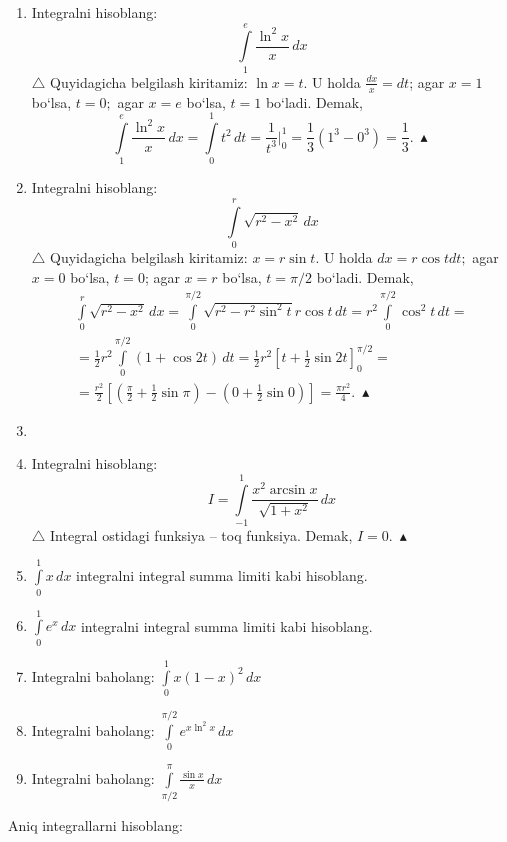 \begin{enumerate}
	\item Integralni hisoblang:
	$$\int\limits_{1}^{e}\frac{\ln^{2}x}{x}\,dx$$
	$\triangle$ Quyidagicha  belgilash kiritamiz: $\ln{x}=t$. U holda $\frac{dx}{x}=dt$; agar $x=1$ bo`lsa, $t=0;$ agar $x=e$ bo`lsa, $t=1$ bo`ladi. Demak,
	$$\int\limits_{1}^{e}\frac{\ln^{2}x}{x}\,dx=\int\limits_{0}^{1}t^{2}\,dt=\frac{1}{t^{3}}\bigg|_{0}^{1}=\frac{1}{3}(1^{3}-0^{3})=\frac{1}{3}.\ \blacktriangle$$
	
	\item Integralni hisoblang:
	$$\int\limits_{0}^{r}\sqrt{r^{2}-x^{2}}\,dx$$
	$\triangle$ Quyidagicha  belgilash kiritamiz: $x=r\sin{t}$. U holda $dx=r\cos{t}dt;$ agar $x=0$ bo`lsa, $t=0$; agar $x=r$ bo`lsa, $t=\pi/2$ bo`ladi. Demak,
\begin{multline*}
	\int\limits_{0}^{r}\sqrt{r^{2}-x^{2}}\,dx=\int\limits_{0}^{\pi/2}\sqrt{r^{2}-r^{2}\sin^{2}t}r\cos{t}\,dt=r^{2}\int\limits_{0}^{\pi/2}\cos^{2}t\,dt=\\
	=\frac{1}{2}r^{2}\int\limits_{0}^{\pi/2}(1+\cos{2t})\,dt=\frac{1}{2}r^{2}\left[t+\frac{1}{2}\sin{2t}\right]_{0}^{\pi/2}=\\
	=\frac{r^{2}}{2}\left[\left(\frac{\pi}{2}+\frac{1}{2}\sin{\pi}\right)-\left(0+\frac{1}{2}\sin{0}\right)\right]=\frac{\pi r^{2}}{4}.\ \blacktriangle
\end{multline*}

\item 

\item Integralni hisoblang:
$$I=\int\limits_{-1}^{1}\frac{x^{2}\arcsin{x}}{\sqrt{1+x^{2}}}\,dx$$
$\triangle$ Integral ostidagi funksiya -- toq funksiya. Demak, $I=0.\ \blacktriangle$

\item $\int\limits_{0}^{1}x\,dx$ integralni integral summa limiti kabi hisoblang.

\item $\int\limits_{0}^{1}e^{x}\,dx$ integralni integral summa limiti kabi hisoblang.

\item Integralni baholang:
$\int\limits_{0}^{1}x(1-x)^{2}\,dx$

\item Integralni baholang:
$\int\limits_{0}^{\pi/2}e^{x\ln^{2}{x}}\,dx$

\item Integralni baholang:
$\int\limits_{\pi/2}^{\pi}\frac{\sin{x}}{x}\,dx$
\end{enumerate}
Aniq integrallarni hisoblang:

